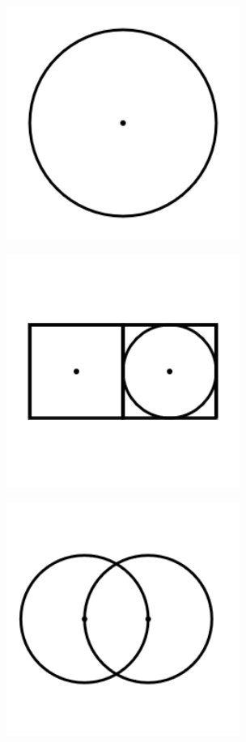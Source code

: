\documentclass[11pt]{article}
\begin{document}
\includegraphics[width=3in]{image1.png}





\includegraphics[width=3in]{image2.png}

\includegraphics[width=3in]{image3.png}
\end{document}
